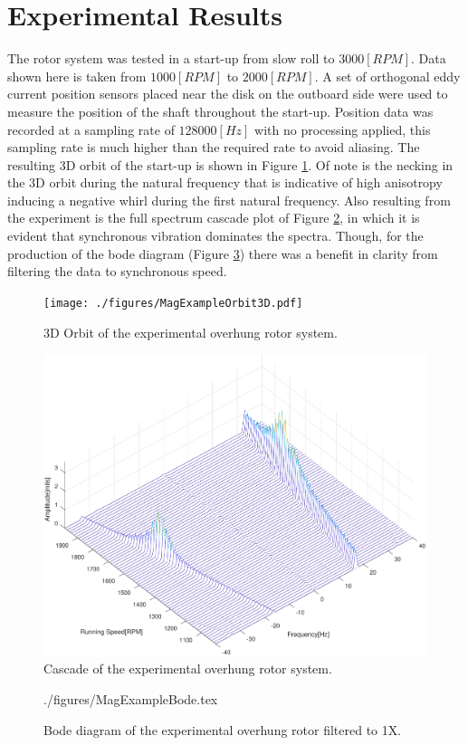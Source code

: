 \section{Experimental Results}
The rotor system was tested in a start-up from slow roll to $ 3000[RPM] $. Data shown here is taken from $ 1000[RPM] $ to $ 2000[RPM] $. A set of orthogonal eddy current position sensors placed near the disk on the outboard side were used to measure the position of the shaft throughout the start-up. Position data was recorded at a sampling rate of $ 128000[Hz] $ with no processing applied, this sampling rate is much higher than the required rate to avoid aliasing. The resulting 3D orbit of the start-up is shown in Figure \ref{fig:MagExampleOrbit3D}. Of note is the necking in the 3D orbit during the natural frequency that is indicative of high anisotropy inducing a negative whirl during the first natural frequency. Also resulting from the experiment is the full spectrum cascade plot of Figure \ref{fig:MagExampleCascade}, in which it is evident that synchronous vibration dominates the spectra. Though, for the production of the bode diagram (Figure \ref{fig:MagExampleBode}) there was a benefit in clarity from filtering the data to synchronous speed.
\begin{figure}
	\centering
	\texttt{[image: ./figures/MagExampleOrbit3D.pdf]}
	\caption{3D Orbit of the experimental overhung rotor system.}
	\label{fig:MagExampleOrbit3D}
\end{figure}
\begin{figure}
	\centering
	\includegraphics[width=.8\linewidth]{./figures/MagExampleCascade.pdf}
	\caption{Cascade of the experimental overhung rotor system.}
	\label{fig:MagExampleCascade}
\end{figure}
\begin{figure}[!htb]
	\def\width{.7\linewidth}
	\def\height{.4\linewidth}
	\def\sep{3em}
	\centering
	{./figures/MagExampleBode.tex}
	\caption{Bode diagram of the experimental overhung rotor filtered to 1X.}
	\label{fig:MagExampleBode}
\end{figure}
